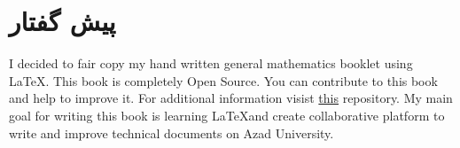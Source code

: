 \maketitle
\newpage

\tableofcontents
\newpage

\section{پیش گفتار}
I decided to fair copy my hand written general mathematics booklet using \LaTeX. This book is completely Open Source.
You can contribute to this book and help to improve it. For additional information visist \href{https://github.com/alirezaarzehgar/docs}{this} repository.
My main goal for writing this book is learning \LaTeX and create collaborative platform to write and improve technical documents on Azad University.
